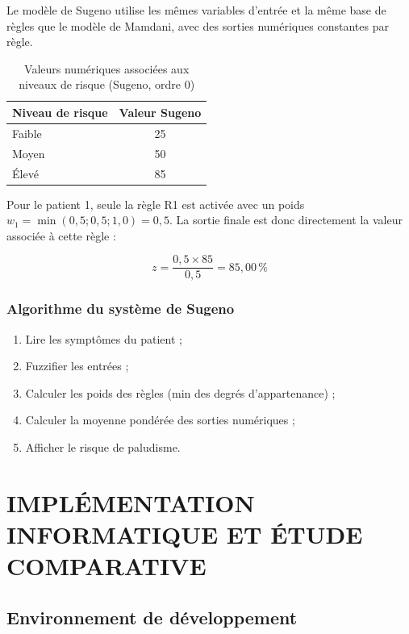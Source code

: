 \documentclass[a4paper,12pt]{report} %
\begin{document}
Le modèle de Sugeno utilise les mêmes variables d'entrée et la même base de règles que le modèle de Mamdani, avec des sorties numériques constantes par règle.

\begin{table}[H]
\centering
\caption{Valeurs numériques associées aux niveaux de risque (Sugeno, ordre 0)}
\begin{tabular}{|l|c|}
\hline
\textbf{Niveau de risque} & \textbf{Valeur Sugeno} \\
\hline
Faible & 25 \\
Moyen & 50 \\
Élevé & 85 \\
\hline
\end{tabular}
\end{table}

Pour le patient 1, seule la règle R1 est activée avec un poids \(w_1 = \min(0,5;0,5;1,0) = 0,5\). La sortie finale est donc directement la valeur associée à cette règle :

\[
z = \frac{0{,}5 \times 85}{0{,}5} = 85{,}00\,\%
\]

\subsection{Algorithme du système de Sugeno}

\begin{enumerate}
\item Lire les symptômes du patient ;
\item Fuzzifier les entrées ;
\item Calculer les poids des règles (min des degrés d'appartenance) ;
\item Calculer la moyenne pondérée des sorties numériques ;
\item Afficher le risque de paludisme.
\end{enumerate}


\newpage
\chapter{IMPLÉMENTATION INFORMATIQUE ET ÉTUDE COMPARATIVE}

\section{Environnement de développement}
\end{document}
